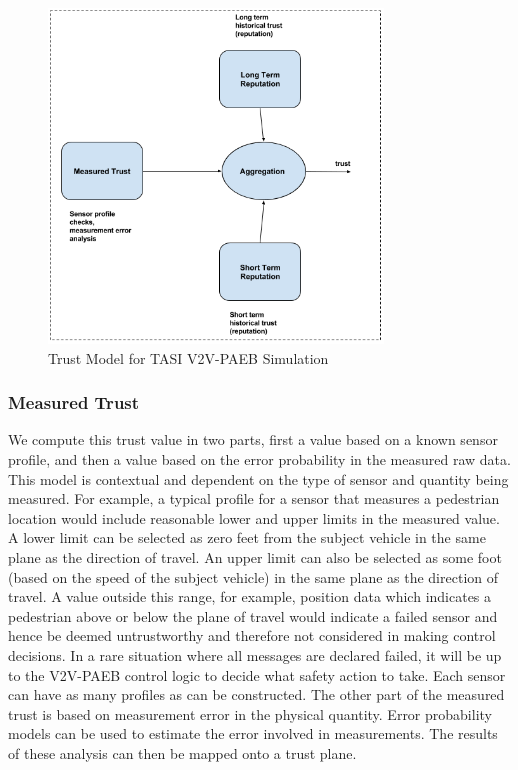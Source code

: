 \documentclass[conference]{IEEEtran}
\begin{document}

\begin{figure}[h]
\centering
\includegraphics[width=3.5in]{Trust_Model.png}
\caption{Trust Model for TASI V2V-PAEB Simulation}
\label{tmodel}
\end{figure}

\subsubsection{Measured Trust}
We compute this trust value in two parts, first a value based on a known sensor profile, and then a value based on the error probability in the measured raw data. This model is contextual and dependent on the type of sensor and quantity being measured. For example, a typical profile for a sensor that measures a pedestrian location would include reasonable lower and upper limits in the measured value. A lower limit can be selected as zero feet from the subject vehicle in the same plane as the direction of travel. An upper limit can also be selected as some foot (based on the speed of the subject vehicle) in the same plane as the direction of travel. A value outside this range, for example, position data which indicates a pedestrian above or below the plane of travel would indicate a failed sensor and hence be deemed untrustworthy and therefore not considered in making control decisions. In a rare situation where all messages are declared failed, it will be up to the V2V-PAEB control logic to decide what safety action to take. Each sensor can have as many profiles as can be constructed. The other part of the measured trust is based on measurement error in the physical quantity. Error probability models can be used to estimate the error involved in measurements. The results of these analysis can then be mapped onto a trust plane.
\end{document}
